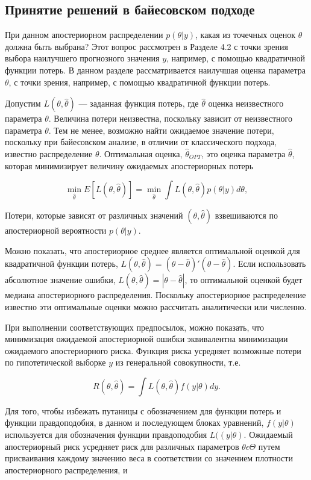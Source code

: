 \subsection{Принятие решений в байесовском подходе}

При данном апостериорном распределении $p(\theta|y)$, какая из точечных оценок $\theta$ должна быть выбрана? Этот вопрос рассмотрен в Разделе 4.2 с точки зрения выбора наилучшего прогнозного значения $y$, например, с помощью  квадратичной функции потерь. В данном разделе рассматривается наилучшая оценка параметра $\theta$, с точки зрения, например, с помощью квадратичной функции потерь.

Допустим $L(\theta,\hat{\theta})$ --- заданная функция потерь, где $\hat{\theta}$ оценка неизвестного параметра $\theta$. Величина потери неизвестна, поскольку зависит от неизвестного параметра $\theta$. Тем не менее, возможно найти ожидаемое значение потери, поскольку при байесовском анализе, в отличии от классического подхода, известно распределение $\theta$. Оптимальная оценка, $\hat{\theta}_{OPT}$, это оценка параметра $\hat{\theta}$, которая минимизирует величину ожидаемых апостериорных потерь

\begin{equation}
\underset{\hat{\theta}}{\min}E[L(\theta,\hat{\theta})]=\underset{\hat{\theta}}{\min}\int{L}(\theta,\hat{\theta})p(\theta|y)d\theta,
\end{equation}

Потери, которые зависят от различных значений $(\theta,\hat{\theta})$ взвешиваются по апостериорной вероятности  $p(\theta|y)$.

Можно показать, что апостериорное среднее является оптимальной оценкой для квадратичной функции потерь, $L(\theta,\hat{\theta})=(\theta-\hat{\theta})'(\theta-\hat{\theta})$. Если использовать абсолютное значение ошибки, $L(\theta,\hat{\theta})=|\theta-\hat{\theta}|$, то оптимальной оценкой будет медиана апостериорного распределения. Поскольку апостериорное распределение известно эти оптимальные оценки можно рассчитать аналитически или численно.

При выполнении соответствующих предпосылок, можно показать, что минимизация ожидаемой апостериорной ошибки  эквивалентна минимизации ожидаемого апостериорного риска. Функция риска усредняет возможные потери по гипотетической выборке $y$ из генеральной совокупности, т.е. 

\[
R(\theta,\hat{\theta})=\int{L}(\theta,\hat{\theta})f(y|\theta)dy.
\]

Для того, чтобы избежать путаницы с обозначением для функции потерь и функции правдоподобия, в данном и последующем блоках уравнений, $f(y|\theta)$ используется для обозначения функции правдоподобия $L((y|\theta)$. Ожидаемый апостериорный риск  усредняет риск для различных параметров $\theta{\epsilon}\Theta$ путем присваивания каждому значению веса в соответствии со значением плотности апостериорного распределения, и 

